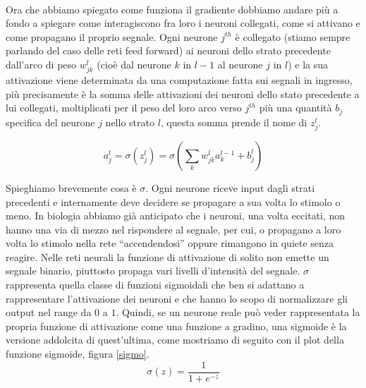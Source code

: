 \\
Ora che abbiamo spiegato come funziona il gradiente dobbiamo andare più a fondo a spiegare come interagiscono fra loro i neuroni collegati, come si attivano e come propagano il proprio segnale.
Ogni neurone $j^{th}$ è collegato (stiamo sempre parlando del caso delle reti feed forward) ai neuroni dello strato precedente dall'arco di peso $w^{l}_{jk}$ (cioè dal neurone $k$ in $l-1$ al neurone $j$ in $l$) e la sua attivazione viene determinata da una computazione fatta sui segnali in ingresso, più precisamente è la somma delle attivazioni dei neuroni dello stato precedente a lui collegati, moltiplicati per il peso del loro arco verso $j^{th}$ più una quantità $b_{j}$ specifica del neurone $j$ nello strato $l$, questa somma prende il nome di $z^{l}_{j}$. 

\begin{equation}
	\displaystyle a^{l}_{j}=\sigma\left( z^{l}_{j}\right) = \sigma \left( \sum_{k}w^{l}_{jk}a^{l-1}_k +b^{l}_{j} \right)
	\label{2.4}
\end{equation}

Spieghiamo brevemente cosa è $\sigma$. Ogni neurone riceve input dagli strati precedenti e internamente deve decidere se propagare a sua volta lo stimolo o meno. In biologia abbiamo già anticipato che i neuroni, una volta eccitati, non hanno una via di mezzo nel rispondere al segnale, per cui, o propagano a loro volta lo stimolo nella rete ``accendendosi''  oppure rimangono in quiete senza reagire. Nelle reti neurali la funzione di attivazione di solito non emette un segnale binario, piuttosto propaga vari livelli d'intensità del segnale. $\sigma$ rappresenta quella classe di funzioni sigmoidali che ben si adattano a rappresentare l'attivazione dei neuroni e che hanno lo scopo di normalizzare gli output nel range da $0$ a $1$. Quindi, se un neurone reale può veder rappresentata la propria funzione di attivazione come una funzione a gradino, una sigmoide è la versione addolcita di quest'ultima, come mostriamo di seguito con il plot della funzione sigmoide, figura \ref{sigmo}.
\begin{equation}
	\sigma(z)=\dfrac{1}{1+e^{-z}}
\end{equation}

